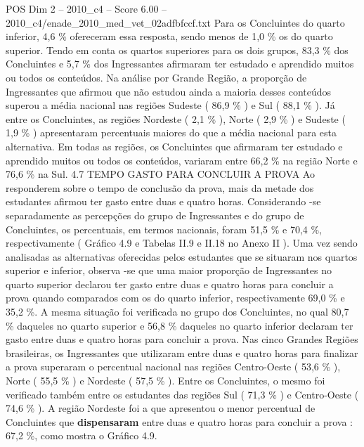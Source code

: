 \begin{textsample}{POS Dim 2 – 2010\_c4 – Score 6.00 – 2010\_c4/enade\_2010\_med\_vet\_02adfbfccf.txt}
Para os Concluintes do quarto inferior, 4,6 \% ofereceram essa resposta, sendo menos de 1,0 \% os do quarto superior.
Tendo em conta os quartos superiores para os dois grupos, 83,3 \% dos Concluintes e 5,7 \% dos Ingressantes afirmaram ter estudado e aprendido muitos ou todos os conteúdos.
Na análise por Grande Região, a proporção de Ingressantes que afirmou que não estudou ainda a maioria desses conteúdos superou a média nacional nas regiões Sudeste ( 86,9 \% ) e Sul ( 88,1 \% ).
Já entre os Concluintes, as regiões Nordeste ( 2,1 \% ), Norte ( 2,9 \% ) e Sudeste ( 1,9 \% ) apresentaram percentuais maiores do que a média nacional para esta alternativa.
Em todas as regiões, os Concluintes que afirmaram ter estudado e aprendido muitos ou todos os conteúdos, variaram entre 66,2 \% na região Norte e 76,6 \% na Sul. 4.7 TEMPO GASTO PARA CONCLUIR A PROVA Ao responderem sobre o tempo de conclusão da prova, mais da metade dos estudantes afirmou ter gasto entre duas e quatro horas.
Considerando -se separadamente as percepções do grupo de Ingressantes e do grupo de Concluintes, os percentuais, em termos nacionais, foram 51,5 \% e 70,4 \%, respectivamente ( Gráfico 4.9 e Tabelas II.9 e II.18 no Anexo II ).
Uma vez sendo analisadas as alternativas oferecidas pelos estudantes que se situaram nos quartos superior e inferior, observa -se que uma maior proporção de Ingressantes no quarto superior declarou ter gasto entre duas e quatro horas para concluir a prova quando comparados com os do quarto inferior, respectivamente 69,0 \% e 35,2 \%.
A mesma situação foi verificada no grupo dos Concluintes, no qual 80,7 \% daqueles no quarto superior e 56,8 \% daqueles no quarto inferior declaram ter gasto entre duas e quatro horas para concluir a prova.
Nas cinco Grandes Regiões brasileiras, os Ingressantes que utilizaram entre duas e quatro horas para finalizar a prova superaram o percentual nacional nas regiões Centro-Oeste ( 53,6 \% ), Norte ( 55,5 \% ) e Nordeste ( 57,5 \% ).
Entre os Concluintes, o mesmo foi verificado também entre os estudantes das regiões Sul ( 71,3 \% ) e Centro-Oeste ( 74,6 \% ).
A região Nordeste foi a que apresentou o menor percentual de Concluintes que \textbf{dispensaram} entre duas e quatro horas para concluir a prova : 67,2 \%, como mostra o Gráfico 4.9.

\end{textsample}
